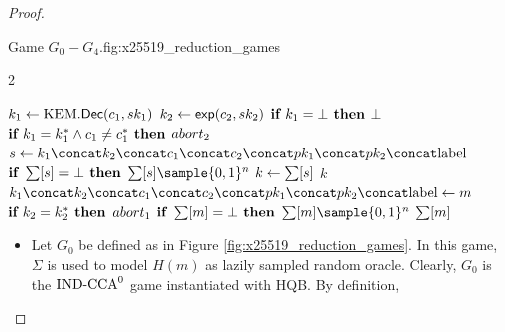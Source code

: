 \documentclass{article}
\begin{document}
\begin{proof}
\begin{gamefigure}{Game $G_0 - G_4$.}{fig:x25519_reduction_games}
\begin{games}{2}
\begin{gameenv}{\oracledec}
                                \State $k_1 \leftarrow \text{KEM}.\textsf{Dec}(c_1, sk_1)$
                                \State $k_2 \leftarrow \textsf{exp}(c_2, sk_2)$
                                \State $\textbf{if } k_1 = \bot \textbf{ then}$
                                    \State \quad \Return $\bot$
                                    \BeginBox[draw=\gthree]
                                        \State $\textbf{if } k_1 = k^*_1 \wedge c_1 \neq c^*_1 \textbf{ then}$
                                            \State \quad $abort_2$
                                        \EndBox
                                        \State $s \assign \hashinput$
                                        \State $\textbf{if } \sum[s] = \bot \textbf{ then}$
                                            \State \quad $\ROMtable[s] \sample \bits^{n}$
                                            \State $k \leftarrow \sum[s]$
                                            \State \Return $k$
                                            \Statex
                                            \State \underline{}
                                            \State $\hashinput \gets m$
                                            \BeginBox[draw=\gtwo]
                                                \\
                                                 $\textbf{if } k_2 = k^*_2 \textbf{ then}$
                                                        \State \qquad $abort_1$
                                                    \EndBox
                                                    \State $\textbf{if } \sum[m] = \bot \textbf{ then}$
                                                        \State \quad $\ROMtable[m] \sample \bits^{n}$
                                                        \State \Return $\sum[m]$
                                                    \end{gameenv}
                                                \end{games}
                                                \begin{gameenv}{}

                                                \end{gameenv}
                                            \end{gamefigure}

                                            \begin{itemize}
                                            \item[\textbf{Game 0}]
                                                Let $G_0$ be defined as in Figure \ref{fig:x25519_reduction_games}.
                                                In this game, $\Sigma$ is used to model $H(m)$ as lazily sampled random oracle.
                                                Clearly, $G_0$ is the $\text{IND-CCA}^0$ game instantiated with HQB.
                                                By definition,


\end{itemize}
\end{proof}
\end{document}
